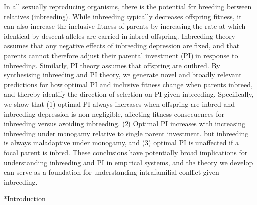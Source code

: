 \documentclass[12pt]{article}
\makeatletter
\renewcommand\section{\@startsection{section}{1}{0in}{-0.5\baselineskip}{0.1\baselineskip}{\normalfont\large\bfseries}}
\makeatother
\begin{document}
In all sexually reproducing organisms, there is the potential for breeding between relatives (inbreeding). While inbreeding typically decreases offspring fitness, it can also increase the inclusive fitness of parents by increasing the rate at which identical-by-descent alleles are carried in inbred offspring. Inbreeding theory assumes that any negative effects of inbreeding depression are fixed, and that parents cannot therefore adjust their parental investment (PI) in response to inbreeding. Similarly, PI theory assumes that offspring are outbred. By synthesising inbreeding and PI theory, we generate novel and broadly relevant predictions for how optimal PI and inclusive fitness change when parents inbreed, and thereby identify the direction of selection on PI given inbreeding. Specifically, we show that (1) optimal PI always increases when offspring are inbred and inbreeding depression is non-negligible, affecting fitness consequences for inbreeding versus avoiding inbreeding. (2) Optimal PI increases with increasing inbreeding under monogamy relative to single parent investment, but inbreeding is always maladaptive under monogamy, and (3) optimal PI is unaffected if a focal parent is inbred. These conclusions have potentially broad implications for understanding inbreeding and PI in empirical systems, and the theory we develop can serve as a foundation for understanding intrafamilial conflict given inbreeding.

\section*{Introduction}


\end{document}
